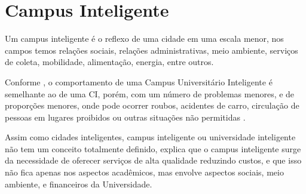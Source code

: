 





\section{Campus Inteligente}

Um campus inteligente é o reflexo de uma cidade em uma escala menor, nos campos temos relações sociais, relações administrativas, meio ambiente, serviços de coleta, mobilidade, alimentação, energia, entre outros.

Conforme , o comportamento de uma Campus Universitário Inteligente é semelhante ao de uma CI, porém, com um número de problemas menores, e de proporções menores, onde pode ocorrer roubos, acidentes de carro, circulação de pessoas em lugares proibidos ou outras situações não permitidas \cite{garay2018}.

Assim como cidades inteligentes, campus inteligente ou universidade inteligente não tem um conceito totalmente definido,  explica que o campus inteligente surge da necessidade de oferecer serviços de alta qualidade reduzindo custos, e que isso não fica apenas nos aspectos acadêmicos, mas envolve aspectos sociais, meio ambiente, e financeiros da Universidade.

